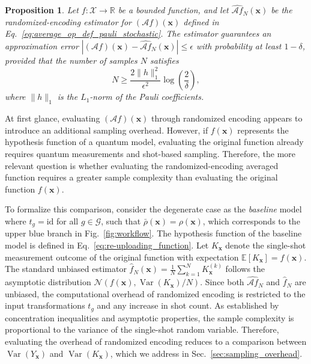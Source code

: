 \documentclass[%
 reprint,
 amsmath,amssymb,
 aps,
 pra,
]{revtex4-2}
\newtheorem{proposition}[theorem]{Proposition}
\theoremstyle{definition}
\begin{document}
\begin{proposition}
\label{prop:randomized_encoding_shots}
Let \(f: \mathcal{X} \to \mathbb{R}\) be a bounded function, and let \(\widehat{\mathcal{A}f}_N(\bm{x})\) be the randomized-encoding estimator for \((\mathcal{A} f)(\bm{x})\) defined in Eq.~\eqref{eq:average_op_def_pauli_stochastic}. The estimator guarantees an approximation error \(|(\mathcal{A} f)(\bm{x}) - \widehat{\mathcal{A}f}_N(\bm{x})| \leq \epsilon\) with probability at least \(1 - \delta\), provided that the number of samples \(N\) satisfies
\begin{equation}
N \geq \frac{2\|h\|_1^2}{\epsilon^2} \log \left(\frac{2}{\delta}\right),
\end{equation}
where \(\|h\|_1\) is the \(L_1\)-norm of the Pauli coefficients.
\end{proposition}

At first glance, evaluating \((\mathcal{A}f)(\bm{x})\) through randomized encoding appears to introduce an additional sampling overhead. However, if \(f(\bm{x})\) represents the hypothesis function of a quantum model, evaluating the original function already requires quantum measurements and shot-based sampling. Therefore, the more relevant question is whether evaluating the randomized-encoding averaged function requires a greater sample complexity than evaluating the original function \(f(\bm{x})\).

To formalize this comparison, consider the degenerate case as the \textit{baseline} model where \(t_g = \mathrm{id}\) for all \(g \in \mathcal{G}\), such that \(\bar{\rho}(\bm{x}) = \rho(\bm{x})\), which corresponds to the upper blue branch in Fig.~\ref{fig:workflow}. The hypothesis function of the baseline model is defined in Eq.~\eqref{eq:re-uploading_function}. Let \(K_{\bm{x}}\) denote the single-shot measurement outcome of the original function with expectation \(\mathbb{E}[K_{\bm{x}}] = f(\bm{x})\). The standard unbiased estimator \(\widehat{f}_N(\bm{x}) = \frac{1}{N} \sum_{k=1}^N K_{\bm{x}}^{(k)}\) follows the asymptotic distribution \(\mathcal{N}(f(\bm{x}), \operatorname{Var}(K_{\bm{x}})/N)\). Since both \(\widehat{\mathcal{A}f}_N\) and \(\widehat{f}_N\) are unbiased, the computational overhead of randomized encoding is restricted to the input transformations \(t_g\) and any increase in shot count. As established by concentration inequalities and asymptotic properties, the sample complexity is proportional to the variance of the single-shot random variable. Therefore, evaluating the overhead of randomized encoding reduces to a comparison between \(\operatorname{Var}(Y_{\bm{x}})\) and \(\operatorname{Var}(K_{\bm{x}})\), which we address in Sec.~\ref{sec:sampling_overhead}.
\end{document}
